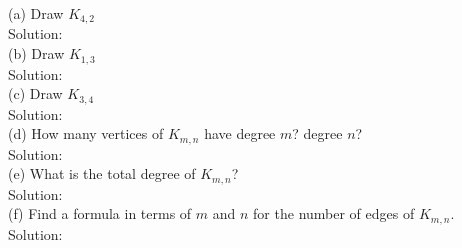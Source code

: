 \documentclass[10 pt]{amsart}
\theoremstyle{definition}
\theoremstyle{remark}
\numberwithin{equation}{subsection}
\begin{document}
(a) Draw $K_{4,2}$\\
Solution:\\

(b) Draw $K_{1,3}$\\
Solution:\\

(c) Draw $K_{3,4}$\\
Solution:\\

(d) How many vertices of $K_{m,n}$ have degree $m$? degree $n$?\\
Solution:\\

(e) What is the total degree of $K_{m,n}$?\\
Solution:\\

(f) Find a formula in terms of $m$ and $n$ for the number of edges of $K_{m,n}$.\\
Solution:\\
\end{document}
